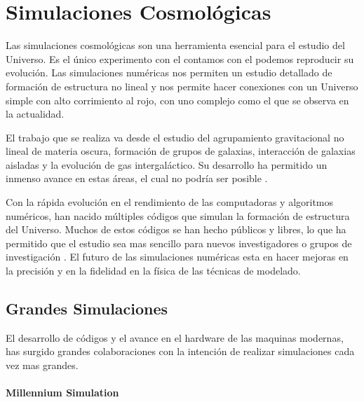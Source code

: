 
\chapter{Simulaciones Cosmológicas}
\label{chap:2 Sim}
\setcounter{equation}{0}

Las simulaciones cosmológicas son una herramienta esencial para el estudio del Universo. Es el único experimento con el contamos con el podemos reproducir su evolución. Las simulaciones numéricas nos permiten un estudio detallado de formación de estructura no lineal y nos permite hacer conexiones con un Universo simple con alto corrimiento al rojo, con uno complejo como el que se observa en la actualidad.

El trabajo que se realiza va desde el estudio del agrupamiento gravitacional no lineal de materia oscura, formación de grupos de galaxias, interacción de galaxias aisladas y la evolución de gas intergaláctico. Su desarrollo ha permitido un inmenso avance en estas áreas, el cual no podría ser posible  \cite{2001NewA....6...79S}.


Con la rápida evolución en el rendimiento de las computadoras y algoritmos numéricos, han nacido múltiples códigos que simulan la formación de estructura del Universo. Muchos de estos códigos se han hecho públicos y libres, lo que ha permitido que el estudio sea mas sencillo para nuevos investigadores o grupos de investigación \cite{2021MNRAS.506.2871S}. El futuro de las simulaciones numéricas esta en hacer mejoras en la precisión y en la fidelidad en la física de las técnicas de modelado.


\section{Grandes Simulaciones}

El desarrollo de códigos y el avance en el hardware de las maquinas modernas, has surgido grandes colaboraciones con la intención de realizar simulaciones cada vez mas grandes.

\subsubsection{Millennium Simulation}

